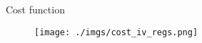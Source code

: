 \documentclass[notes,11pt, aspectratio=169]{beamer}
\begin{document}
      \begin{frame}{Cost function}
        \vspace{0.5cm}
          
            \begin{figure}[t*]
              \centering
        
              \texttt{[image: ./imgs/cost\_iv\_regs.png]}
            \end{figure}
            
          \end{frame}



\end{document}
